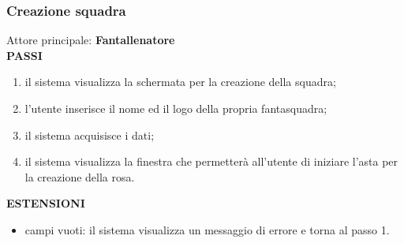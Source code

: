 \documentclass[12pt,a4paper]{article}
\begin{document}
\subsubsection{Creazione squadra}
Attore principale: \textbf{Fantallenatore}\\
\newline
\textbf{PASSI}
\begin{enumerate}
\item il sistema visualizza la schermata per la creazione della squadra;
\item l'utente inserisce il nome ed il logo della propria fantasquadra;
\item il sistema acquisisce i dati;
\item il sistema visualizza la finestra che permetterà all'utente di iniziare l'asta per la creazione della rosa.
\end{enumerate}
\textbf{ESTENSIONI}
\begin{itemize}
\item campi vuoti: il sistema visualizza un messaggio di errore e torna al passo 1.
\end{itemize}
\end{document}
